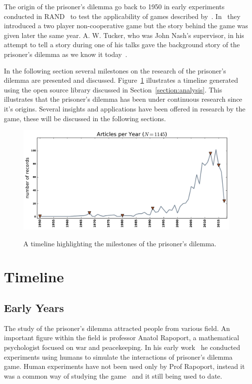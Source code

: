 \documentclass{article}
\begin{document}
The origin of the prisoner's dilemma go back to 1950 in early experiments 
conducted in RAND~\cite{Flood1958} to test the applicability of games
described by~\cite{VonNeumann1944}.  In~\cite{Flood1958} they introduced 
a two player non-cooperative game but the story behind the game was
given later the same year. A. W. Tucker, who was John Nash's supervisor, in 
his attempt to tell a story during one of his talks gave the background story of 
the prisoner's dilemma as we know it today~\cite{Tucker1983}. 

In the following section several milestones on the research of the prisoner's
dilemma are presented and discussed.  Figure~\ref{fig:timeline} illustrates
a timeline generated using the open source library discussed in 
Section~\ref{section:analysis}. This illustrates that the prisoner's dilemma has
been under continuous research since it's origins. Several insights and applications
have been offered in research by the game, these will be discussed in the 
following sections.

\begin{figure}[!htbp]
    \centering
    \includegraphics[width=\textwidth]{assets/images/timeline.pdf}
    \label{fig:timeline}
    \caption{A timeline highlighting the milestones of the prisoner's dilemma.}
\end{figure}

\section{Timeline}\label{section:timeline}

\subsection{Early Years}
The study of the prisoner's dilemma attracted people from various field.
An important figure within the field is professor Anatol Rapoport, a mathematical
psychologist focused on war and peacekeeping.  
In his early work~\cite{rapoport1965} he conducted experiments using humans
to simulate the interactions of prisoner's dilemma game. Human experiments
have not been used only by Prof Rapoport, instead it was a common way of
studying the game~\cite{Evans1966, Gallo1968, Lutzker1961, Mack1971, 
Sensenig1972} and it still being used to date. %
\end{document}
